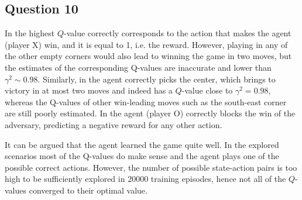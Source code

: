 \documentclass[10pt]{IEEEtran}
\begin{document}
\subsection*{Question 10}
In  the highest $Q$-value correctly corresponds to the action that makes the agent (player X) win, and it is equal to 1, i.e. the reward. However, playing in any of the other empty corners would also lead to winning the game in two moves, but the estimates of the corresponding Q-values are inaccurate and lower than $\gamma^2 \sim 0.98$. Similarly, in  the agent correctly picks the center, which brings to victory in at most two moves and indeed has a $Q$-value close to $\gamma^2 = 0.98$, whereas the Q-values of other win-leading moves such as the south-east corner are still poorly estimated. In  the agent (player O) correctly blocks the win of the adversary, predicting a negative reward for any other action.

It can be argued that the agent learned the game quite well. In the explored scenarios most of the Q-values do make sense and the agent plays one of the possible correct actions. However, the number of possible state-action pairs is too high to be sufficiently explored in $20000$ training episodes, hence not all of the $Q$-values converged to their optimal value. 
\end{document}
